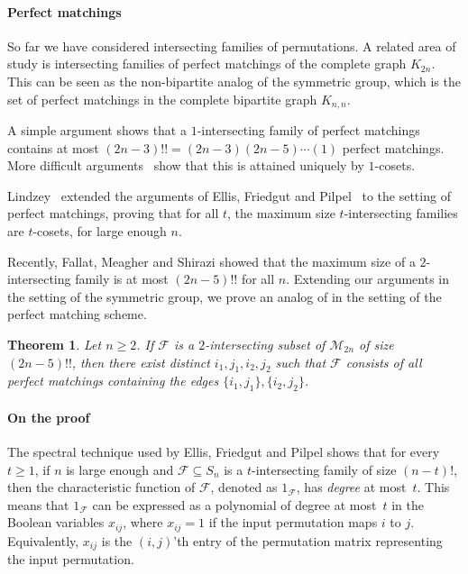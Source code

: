 \documentclass{article}
\newtheorem{theorem}{Theorem}[section]
\theoremstyle{definition}
\providecommand{\cM}{\mathcal{M}}
\begin{document}
\paragraph{Perfect matchings} So far we have considered intersecting families of permutations. A related area of study is intersecting families of perfect matchings of the complete graph $K_{2n}$. This can be seen as the non-bipartite analog of the symmetric group, which is the set of perfect matchings in the complete bipartite graph $K_{n,n}$.

A simple argument shows that a $1$-intersecting family of perfect matchings contains at most $(2n-3)!! = (2n-3)(2n-5)\cdots(1)$ perfect matchings. More difficult arguments~\cite{GodsilMeagherPM,Lindzey17,MeagherMoura,DFLLV} show that this is attained uniquely by $1$-cosets. 

Lindzey~\cite{Lindzey18,LindzeyThesis} extended the arguments of Ellis, Friedgut and Pilpel~\cite{EFP,EllisCameronKu} to the setting of perfect matchings, proving that for all $t$, the maximum size $t$-intersecting families are $t$-cosets, for large enough $n$.

Recently, Fallat, Meagher and Shirazi showed that the maximum size of a $2$-intersecting family is at most $(2n-5)!!$ for all $n$. Extending our arguments in the setting of the symmetric group, we prove an analog of  in the setting of the perfect matching scheme.

\begin{theorem} \label{thm:main-pms}
Let $n \geq 2$. If $\mathcal{F}$ is a $2$-intersecting subset of $\cM_{2n}$ of size $(2n-5)!!$, then there exist distinct $i_1,j_1,i_2,j_2$ such that $\mathcal{F}$ consists of all perfect matchings containing the edges $\{i_1,j_1\},\{i_2,j_2\}$.
\end{theorem}

\paragraph{On the proof} The spectral technique used by Ellis, Friedgut and Pilpel shows that for every $t \geq 1$, if $n$ is large enough and $\mathcal{F} \subseteq S_n$ is a $t$-intersecting family of size $(n-t)!$, then the characteristic function of $\mathcal{F}$, denoted as $1_{\mathcal{F}}$, has \emph{degree} at most~$t$. This means that $1_{\mathcal{F}}$ can be expressed as a polynomial of degree at most~$t$ in the Boolean variables $x_{ij}$, where $x_{ij} = 1$ if the input permutation maps $i$ to $j$. Equivalently, $x_{ij}$ is the $(i,j)$'th entry of the permutation matrix representing the input permutation.
\end{document}
